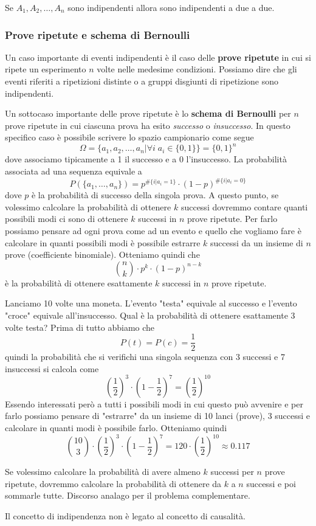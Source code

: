 \begin{observation}
	Se $A_1, A_2, \dots, A_n$ sono indipendenti allora sono indipendenti a due a due.
\end{observation}

\subsubsection{Prove ripetute e schema di Bernoulli}
Un caso importante di eventi indipendenti è il caso delle \textbf{prove ripetute} in cui si ripete
un esperimento $n$ volte nelle medesime condizioni. Possiamo dire che gli eventi riferiti a
ripetizioni distinte o a gruppi disgiunti di ripetizione sono indipendenti.

Un sottocaso importante delle prove ripetute è lo \textbf{schema di Bernoulli} per $n$ prove
ripetute in cui ciascuna prova ha esito \emph{successo} o \emph{insuccesso}. In questo specifico
caso è possibile scrivere lo spazio campionario come segue
\[ \Omega = \{ a_1, a_2, \dots, a_n | \forall i \; a_i \in \{ 0, 1 \} \} = \{ 0, 1 \}^n \]
dove associamo tipicamente a 1 il successo e a 0 l'insuccesso. La probabilità associata ad una
sequenza equivale a
\[ P(\{ a_1, \dots, a_n \}) = p^{\# \{i | a_i = 1\}} \cdot (1 - p)^{\# \{i | a_i = 0\}} \]
dove $p$ è la probabilità di successo della singola prova. A questo punto, se volessimo calcolare
la probabilità di ottenere $k$ successi dovremmo contare quanti possibili modi ci sono di ottenere
$k$ successi in $n$ prove ripetute. Per farlo possiamo pensare ad ogni prova come ad un evento e
quello che vogliamo fare è calcolare in quanti possibili modi è possibile estrarre $k$ successi da
un insieme di $n$ prove (coefficiente binomiale). Otteniamo quindi che
\[ \binom{n}{k} \cdot p^k \cdot (1 - p)^{n - k} \]
è la probabilità di ottenere esattamente $k$ successi in $n$ prove ripetute.

\begin{example}
	Lanciamo 10 volte una moneta. L'evento "testa" equivale al successo e l'evento "croce" equivale
	all'insuccesso. Qual è la probabilità di ottenere esattamente 3 volte testa? Prima di tutto
	abbiamo che
	\[ P(t) = P(c) = \frac{1}{2} \]
	quindi la probabilità che si verifichi una singola sequenza con 3 successi e 7 insuccessi si
	calcola come
	\[
		\left( \frac{1}{2} \right)^3 \cdot \left( 1 - \frac{1}{2} \right)^7
		= \left( \frac{1}{2} \right)^{10}
	\]
	Essendo interessati però a tutti i possibili modi in cui questo può avvenire e per farlo
	possiamo pensare di "estrarre" da un insieme di 10 lanci (prove), 3 successi e calcolare in
	quanti modi è possibile farlo. Otteniamo quindi
	\[
		\binom{10}{3} \cdot \left( \frac{1}{2} \right)^3 \cdot \left( 1 - \frac{1}{2} \right)^7
		= 120 \cdot \left( \frac{1}{2} \right)^{10} \approx 0.117
	\]
\end{example}

Se volessimo calcolare la probabilità di avere almeno $k$ successi per $n$ prove ripetute, dovremmo
calcolare la probabilità di ottenere da $k$ a $n$ successi e poi sommarle tutte. Discorso analago
per il problema complementare.

\begin{observation}
	Il concetto di indipendenza non è legato al concetto di causalità.
\end{observation}
